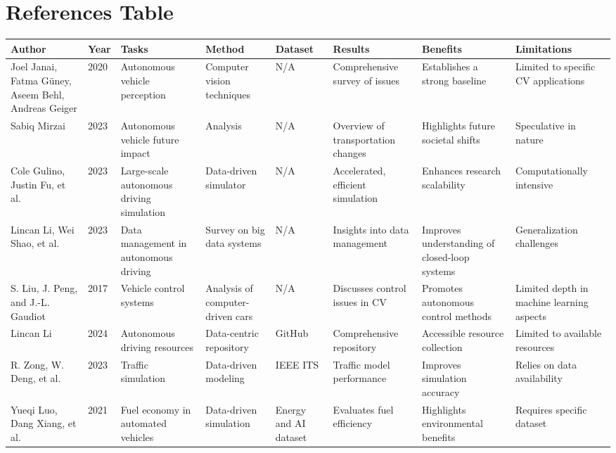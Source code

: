 \documentclass[lettersize,journal]{IEEEtran}
\begin{document}
\renewcommand{\arraystretch}{1.7} %
\section*{References Table}



\begin{longtable}{|p{2cm}|p{1cm}|p{2cm}|p{2cm}|p{2cm}|p{2cm}|p{2cm}|p{2.5cm}|}
\hline
\textbf{Author} & \textbf{Year} & \textbf{Tasks} & \textbf{Method} & \textbf{Dataset} & \textbf{Results} & \textbf{Benefits} & \textbf{Limitations} \\
\hline
Joel Janai, Fatma G{\"u}ney, Aseem Behl, Andreas Geiger & 2020 & Autonomous vehicle perception & Computer vision techniques & N/A & Comprehensive survey of issues & Establishes a strong baseline & Limited to specific CV applications \\
\hline
Sabiq Mirzai & 2023 & Autonomous vehicle future impact & Analysis & N/A & Overview of transportation changes & Highlights future societal shifts & Speculative in nature \\
\hline
Cole Gulino, Justin Fu, et al. & 2023 & Large-scale autonomous driving simulation & Data-driven simulator & N/A & Accelerated, efficient simulation & Enhances research scalability & Computationally intensive \\
\hline
Lincan Li, Wei Shao, et al. & 2023 & Data management in autonomous driving & Survey on big data systems & N/A & Insights into data management & Improves understanding of closed-loop systems & Generalization challenges \\
\hline
S. Liu, J. Peng, and J.-L. Gaudiot & 2017 & Vehicle control systems & Analysis of computer-driven cars & N/A & Discusses control issues in CV & Promotes autonomous control methods & Limited depth in machine learning aspects \\
\hline
Lincan Li & 2024 & Autonomous driving resources & Data-centric repository & GitHub & Comprehensive repository & Accessible resource collection & Limited to available resources \\
\hline
R. Zong, W. Deng, et al. & 2023 & Traffic simulation & Data-driven modeling & IEEE ITS & Traffic model performance & Improves simulation accuracy & Relies on data availability \\
\hline
Yueqi Luo, Dang Xiang, et al. & 2021 & Fuel economy in automated vehicles & Data-driven simulation & Energy and AI dataset & Evaluates fuel efficiency & Highlights environmental benefits & Requires specific dataset \\

\end{longtable}
\end{document}
